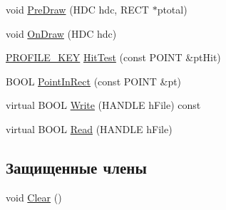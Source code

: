 \begin{DoxyCompactItemize}
void \hyperlink{class_legend_abf18606ec15b245411814d483bf6c84b}{Pre\-Draw} (H\-D\-C hdc, R\-E\-C\-T $\ast$ptotal)
\item 
void \hyperlink{class_legend_aff5b6aaef5b636e6276236ed65e8c1d8}{On\-Draw} (H\-D\-C hdc)
\item 
\hyperlink{profile_8h_ab564cd67657a739c9e5a6caa0ce0dafa}{P\-R\-O\-F\-I\-L\-E\-\_\-\-K\-E\-Y} \hyperlink{class_legend_afc3e60bb5661a763719cdd2a70065fc5}{Hit\-Test} (const P\-O\-I\-N\-T \&pt\-Hit)
\item 
B\-O\-O\-L \hyperlink{class_legend_ac455ef2bd4f20e8889898f02e6c0cc80}{Point\-In\-Rect} (const P\-O\-I\-N\-T \&pt)
\item 
virtual B\-O\-O\-L \hyperlink{class_legend_a93f2a8366a6c5df1b99d4ba2805928b4}{Write} (H\-A\-N\-D\-L\-E h\-File) const 
\item 
virtual B\-O\-O\-L \hyperlink{class_legend_a881509fdd919ed3a30ca822a5edb1114}{Read} (H\-A\-N\-D\-L\-E h\-File)
\end{DoxyCompactItemize}
\subsection*{Защищенные члены}
\begin{DoxyCompactItemize}
\item 
void \hyperlink{class_legend_ae74cfd587be862b4e655bdee5ea08810}{Clear} ()
\end{DoxyCompactItemize}
